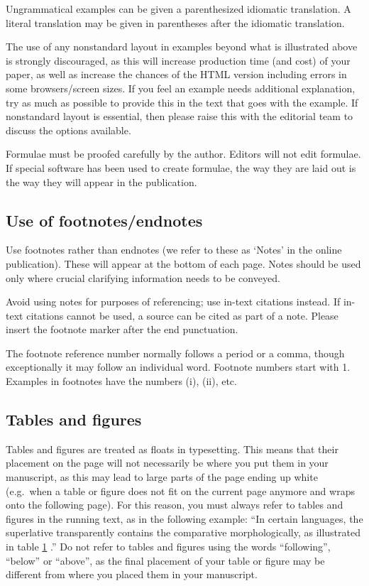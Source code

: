 \documentclass[cm,linguex]{glossa}
\begin{document}
Ungrammatical examples can be given a parenthesized idiomatic
translation. A literal translation may be given in parentheses after the
idiomatic translation.

The use of any nonstandard layout in examples beyond what is illustrated
above is strongly discouraged, as this will increase production time
(and cost) of your paper, as well as increase the chances of the HTML
version including errors in some browsers/screen sizes. If you feel an
example needs additional explanation, try as much as possible to provide
this in the text that goes with the example. If nonstandard layout is
essential, then please raise this with the editorial team to discuss the
options available.

Formulae must be proofed carefully by the author. Editors will not edit
formulae. If special software has been used to create formulae, the way
they are laid out is the way they will appear in the publication.

\hypertarget{fn}{%
\subsection{Use of footnotes/endnotes}\label{fn}}

Use footnotes rather than endnotes (we refer to these as `Notes' in the
online publication). These will appear at the bottom of each page. Notes
should be used only where crucial clarifying information needs to be
conveyed.

Avoid using notes for purposes of referencing; use in-text citations
instead. If in-text citations cannot be used, a source can be cited as
part of a note. Please insert the footnote marker after the end
punctuation.

The footnote reference number normally follows a period or a comma,
though exceptionally it may follow an individual word. Footnote numbers
start with 1. Examples in footnotes have the numbers (i), (ii), etc.

\hypertarget{tables-and-figures}{%
\subsection{Tables and figures}\label{tables-and-figures}}

Tables and figures are treated as floats in typesetting. This means that
their placement on the page will not necessarily be where you put them
in your manuscript, as this may lead to large parts of the page ending
up white (e.g.~when a table or figure does not fit on the current page
anymore and wraps onto the following page). For this reason, you must
always refer to tables and figures in the running text, as in the
following example: ``In certain languages, the superlative transparently
contains the comparative morphologically, as illustrated in table
\protect\hyperlink{tbl:table1}{1} \citep[ 46]{Bobaljik2012}.'' Do not
refer to tables and figures using the words ``following'', ``below'' or
``above'', as the final placement of your table or figure may be
different from where you placed them in your manuscript.
\end{document}
